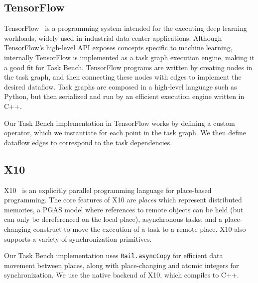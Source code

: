 \subsection{TensorFlow}

TensorFlow~\cite{TensorFlow15} is a programming system intended for
the executing deep learning workloads, widely used in industrial data
center applications. Although TensorFlow's high-level API exposes
concepts specific to machine learning, internally TensorFlow is
implemented as a task graph execution engine, making it a good fit for
Task Bench. TensorFlow programs are written by creating nodes in the
task graph, and then connecting these nodes with edges to implement
the desired dataflow. Task graphs are composed in a high-level
language such as Python, but then serialized and run by an efficient
execution engine written in C++.

Our Task Bench implementation in TensorFlow works by defining a custom
operator, which we instantiate for each point in the task graph. We
then define dataflow edges to correspond to the task dependencies.

\subsection{X10}

X10~\cite{X1005} is an explicitly parallel programming language for
place-based programming. The core features of X10 are \emph{places}
which represent distributed memories, a PGAS model where references to
remote objects can be held (but can only be dereferenced on the local
place), asynchronous tasks, and a place-changing construct to move the
execution of a task to a remote place. X10 also supports a variety of
synchronization primitives.

Our Task Bench implementation uses
\lstinline[language=X10]{Rail.asyncCopy} for efficient data movement
between places, along with place-changing and atomic integers for
synchronization. We use the native backend of X10, which compiles to
C++.
